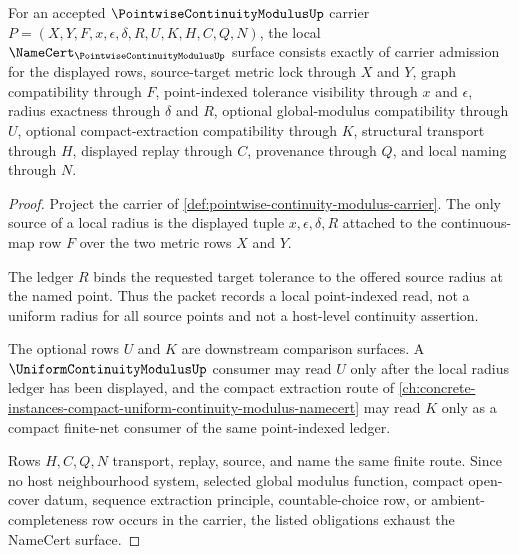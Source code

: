 \begin{theorem}
\label{thm:pointwise-continuity-modulus-namecert-obligations}
For an accepted $\PointwiseContinuityModulusUp$ carrier $P=(X,Y,F,x,\epsilon,\delta,R,U,K,H,C,Q,N)$, the local $\NameCert_{\PointwiseContinuityModulusUp}$ surface consists exactly of carrier admission for the displayed rows, source-target metric lock through $X$ and $Y$, graph compatibility through $F$, point-indexed tolerance visibility through $x$ and $\epsilon$, radius exactness through $\delta$ and $R$, optional global-modulus compatibility through $U$, optional compact-extraction compatibility through $K$, structural transport through $H$, displayed replay through $C$, provenance through $Q$, and local naming through $N$.
\end{theorem}
\begin{proof}
Project the carrier of \autoref{def:pointwise-continuity-modulus-carrier}. The only source of a local radius is the displayed tuple $x,\epsilon,\delta,R$ attached to the continuous-map row $F$ over the two metric rows $X$ and $Y$.

The ledger $R$ binds the requested target tolerance to the offered source radius at the named point. Thus the packet records a local point-indexed read, not a uniform radius for all source points and not a host-level continuity assertion.

The optional rows $U$ and $K$ are downstream comparison surfaces. A $\UniformContinuityModulusUp$ consumer may read $U$ only after the local radius ledger has been displayed, and the compact extraction route of \autoref{ch:concrete-instances-compact-uniform-continuity-modulus-namecert} may read $K$ only as a compact finite-net consumer of the same point-indexed ledger.

Rows $H,C,Q,N$ transport, replay, source, and name the same finite route. Since no host neighbourhood system, selected global modulus function, compact open-cover datum, sequence extraction principle, countable-choice row, or ambient-completeness row occurs in the carrier, the listed obligations exhaust the NameCert surface.
\end{proof}

